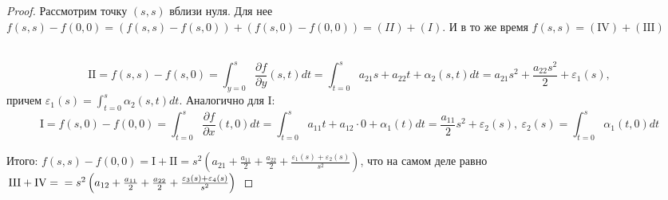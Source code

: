 \begin{theorem}
\begin{proof}
        \newpage
        \begin{minipage}[t]{0.45\textwidth}        
        \end{minipage}
        \begin{minipage}[t]{0.5\textwidth}
            Рассмотрим точку $(s,s)$ вблизи нуля. Для нее 
            $f(s,s) - f(0,0) = (f(s,s) - f(s, 0)) + (f(s,0) - f(0,0)) = (II) + (I)$. \newline
            И в то же время $f(s, s) =  (\text{IV}) + (\text{III})$
        \end{minipage}
        \\[100pt]
        \[\text{II} = f(s,s) - f(s,0) = \int_{y=0}^{s}\frac{\partial f}{\partial y}(s,t)dt
        = \int_{t=0}^{s}a_{21}s + a_{22}t + \alpha_2(s,t)dt = a_{21}s^2 + \frac{a_{22}s^2}{2} + \varepsilon_1(s),\]
        причем $\varepsilon_1(s) = \int_{t=0}^{s}\alpha_2(s,t)dt$. Аналогично для I:
        \[\text{I} = f(s,0) - f(0,0) = \int_{t=0}^{s}\frac{\partial f}{\partial x}(t,0)dt = \int_{t=0}^{s}a_{11}t+a_{12}\cdot0 + \alpha_1(t)dt = 
        \frac{a_{11}}{2}s^2 + \varepsilon_2(s), \ \varepsilon_2(s) = \int_{t=0}^{s}\alpha_1(t,0)dt\]
        
        Итого: $f(s,s) - f(0,0) = \text{I} + \text{II} = s^2 \left( a_{21} + \frac{a_{11}}{2} + \frac{a_{22}}{2}+ \frac{\varepsilon_1(s) + \varepsilon_2(s)}{s^2}\right)$, что на самом деле равно $\text{III} + \text{IV} = 
        \\ = s^2\left(a_{12} + \frac{a_{11}}{2} + \frac{a_{22}}{2} + \frac{\varepsilon_3(s) + \varepsilon_4(s)}{s^2}\right)$
        

\end{proof}
\end{theorem}
